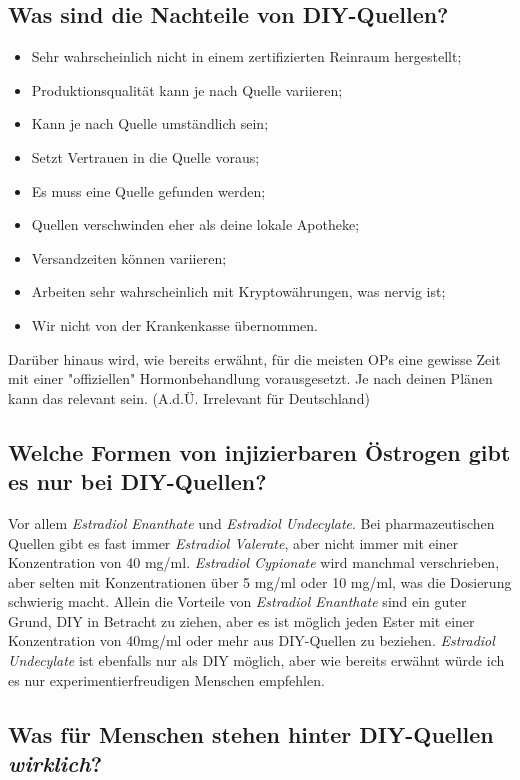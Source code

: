 \documentclass{article}
\begin{document}
{\subsection{Was sind die Nachteile von DIY-Quellen?}

\begin{itemize}
  \item Sehr wahrscheinlich nicht in einem zertifizierten Reinraum hergestellt;
  \item Produktionsqualität kann je nach Quelle variieren;
  \item Kann je nach Quelle umständlich sein;
  \item Setzt Vertrauen in die Quelle voraus;
  \item Es muss eine Quelle gefunden werden;
  \item Quellen verschwinden eher als deine lokale Apotheke;
  \item Versandzeiten können variieren;
  \item Arbeiten sehr wahrscheinlich mit Kryptowährungen, was nervig ist;
  \item Wir nicht von der Krankenkasse übernommen.
\end{itemize}

Darüber hinaus wird, wie bereits erwähnt, für die meisten OPs eine gewisse Zeit mit einer "offiziellen" Hormonbehandlung vorausgesetzt. Je nach deinen Plänen kann das relevant sein. (A.d.Ü. Irrelevant für Deutschland)

\subsection{Welche Formen von injizierbaren Östrogen gibt es nur bei DIY-Quellen?}

Vor allem \textit{Estradiol Enanthate} und \textit{Estradiol Undecylate}. Bei pharmazeutischen Quellen gibt es fast immer \textit{Estradiol Valerate}, aber nicht immer mit einer Konzentration von 40 mg/ml. \textit{Estradiol Cypionate} wird manchmal verschrieben, aber selten mit Konzentrationen über 5 mg/ml oder 10 mg/ml, was die Dosierung schwierig macht. Allein die Vorteile von \textit{Estradiol Enanthate} sind ein guter Grund, DIY in Betracht zu ziehen, aber es ist möglich jeden Ester mit einer Konzentration von 40mg/ml oder mehr aus DIY-Quellen zu beziehen. \textit{Estradiol Undecylate} ist ebenfalls nur als DIY möglich, aber wie bereits erwähnt würde ich es nur experimentierfreudigen Menschen empfehlen.

\subsection{Was für Menschen stehen hinter DIY-Quellen \textit{wirklich}?}

}
\end{document}
